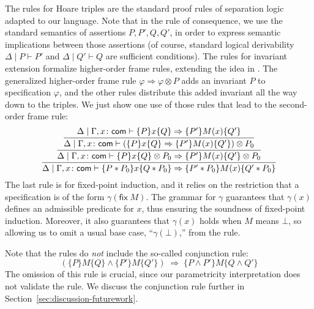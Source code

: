 \documentclass{LMCS}
\newcommand{\com}{\mathsf{com}}
\newcommand{\fix}{\mathsf{fix}}
\newcommand{\mtri}[3]{\{{#1}\}{#2}\{{#3}\}}
\begin{document}
The rules for Hoare triples are the standard proof rules
of separation logic adapted to our language. Note that in 
the rule of consequence, we use the standard
semantics of assertions $P,P',Q,Q'$,
in order to express semantic implications between those assertions
(of course, standard logical derivability
$\Delta\mid P\vdash P'$ and
$\Delta\mid Q'\vdash Q$ are
sufficient conditions).
The rules for invariant extension 
formalize higher-order frame rules,
extending the idea in \cite{birkedal-torpsmith-yang-lics05}.  The generalized higher-order 
frame rule $\varphi \Rightarrow \varphi \otimes P$ adds
an invariant $P$ to specification $\varphi$, and the other
rules distribute this added invariant all the way down to
the triples. 
We just show one use of those rules that lead
to the second-order frame rule: 
{
$$
\infer{
   \Delta \mid \Gamma,x\colon \com \vdash
   \mtri{P*P_0}{x}{Q*P_0} \Rightarrow \mtri{P'*P_0}{M(x)}{Q'*P_0}
}{
  \infer{
      \Delta \mid \Gamma,x\colon \com \vdash
      \mtri{P}{x}{Q}\otimes P_0 
      \Rightarrow 
      \mtri{P'}{M(x)}{Q'} \otimes P_0
  }{
    \infer{
        \Delta \mid \Gamma,x\colon \com \vdash
        (\mtri{P}{x}{Q}
         \Rightarrow 
        \mtri{P'}{M(x)}{Q'}) \otimes P_0
    }{
        \Delta \mid \Gamma,x\colon \com \vdash
        \mtri{P}{x}{Q}
         \Rightarrow
        \mtri{P'}{M(x)}{Q'}
    }
  }
}
$$
}
The last rule is for fixed-point induction,
and it relies on the restriction that
a specification is of the form $\gamma(\fix\;M)$. 
The grammar for $\gamma$ guarantees
that $\gamma(x)$ defines an admissible predicate for $x$,
thus ensuring the soundness of fixed-point induction.
Moreover, it also guarantees that $\gamma(x)$ holds 
when $M$ means $\bot$, so allowing us to
omit a usual base case, ``$\gamma(\bot)$,'' from the rule. 

Note that the rules do \emph{not} include the so-called 
conjunction rule:
$$
  (\mtri{P}{M}{Q} \wedge \mtri{P'}{M}{Q'})\;\Rightarrow\;
  \mtri{P \wedge P'}{M}{Q \wedge Q'}
$$
The omission of this rule is crucial, since
our parametricity interpretation does not validate
the rule. 
We discuss the conjunction rule further
in Section~\ref{sec:discussion-futurework}.
\end{document}
